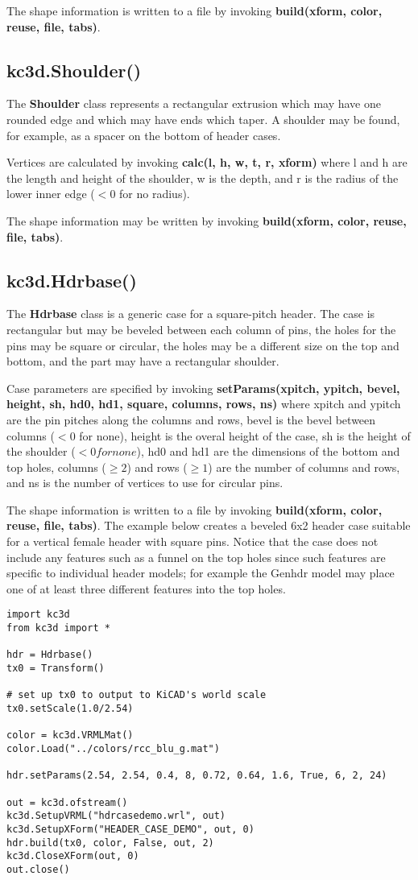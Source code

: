 \documentclass[a4paper, dvipdfm]{article}
\begin{document}
The shape information is written to a file by invoking \textbf{build(xform, color, reuse, file, tabs)}.

\subsection{kc3d.Shoulder()}
The \textbf{Shoulder} class represents a rectangular extrusion which may have one rounded edge
and which may have ends which taper. A shoulder may be found, for example, as a spacer on the
bottom of header cases.

Vertices are calculated by invoking \textbf{calc(l, h, w, t, r, xform)} where l and h are the length
and height of the shoulder, w is the depth, and r is the radius of the lower inner edge ($<0$ for no radius).

The shape information may be written by invoking \textbf{build(xform, color, reuse, file, tabs)}.

\subsection{kc3d.Hdrbase()}
The \textbf{Hdrbase} class is a generic case for a square-pitch header. The case is rectangular but
may be beveled between each column of pins, the holes for the pins may be square or circular, the
holes may be a different size on the top and bottom, and the part may have a rectangular shoulder.

Case parameters are specified by invoking \textbf{setParams(xpitch, ypitch, bevel, height, sh, hd0,
hd1, square, columns, rows, ns)} where xpitch and ypitch are the pin pitches along the columns and
rows, bevel is the bevel between columns ($<0$ for none), height is the overal height of the case,
sh is the height of the shoulder ($<0 for none$), hd0 and hd1 are the dimensions of the bottom and
top holes, columns ($\ge2$) and rows ($\ge1$) are the number of columns and rows, and ns is the number
of vertices to use for circular pins.

The shape information is written to a file by invoking \textbf{build(xform, color, reuse, file, tabs)}.
The example below creates a beveled 6x2 header case suitable for a vertical female header with square pins.
Notice that the case does not include any features such as a funnel on the top holes since such features
are specific to individual header models; for example the Genhdr model may place one of at least three
different features into the top holes.

\begin{verbatim}
import kc3d
from kc3d import *

hdr = Hdrbase()
tx0 = Transform()

# set up tx0 to output to KiCAD's world scale
tx0.setScale(1.0/2.54)

color = kc3d.VRMLMat()
color.Load("../colors/rcc_blu_g.mat")

hdr.setParams(2.54, 2.54, 0.4, 8, 0.72, 0.64, 1.6, True, 6, 2, 24)

out = kc3d.ofstream()
kc3d.SetupVRML("hdrcasedemo.wrl", out)
kc3d.SetupXForm("HEADER_CASE_DEMO", out, 0)
hdr.build(tx0, color, False, out, 2)
kc3d.CloseXForm(out, 0)
out.close()
\end{verbatim}
\end{document}
